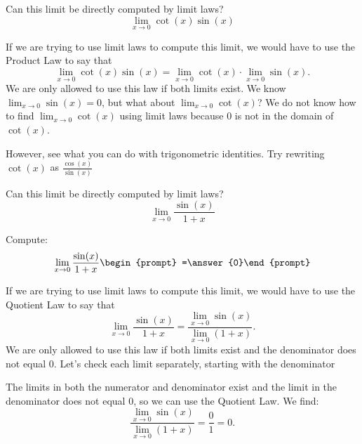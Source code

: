 \documentclass{ximera}
\begin{document}
\begin{question}
  Can this limit be directly computed by limit laws?
  \[
  \displaystyle\lim_{x\to 0} \cot(x)\sin(x)
  \]
  \begin{multipleChoice}
  \end{multipleChoice}
  \begin{feedback}
  If we are trying to use limit laws to compute this limit, we would
  have to use the Product Law to say that
  \[
  \displaystyle\lim_{x\to 0} \cot(x)\sin(x) =\lim_{x\to 0} \cot(x) \cdot \lim_{x\to 0}\sin(x).
  \]
  We are only allowed to use this law if both limits exist.  We know
  $\displaystyle\lim_{x\to 0} \sin(x) = 0$, but what about $\displaystyle\lim_{x\to 0}\cot(x)$?  We do
  not know how to find $\lim_{x\to 0}\cot(x)$ using limit laws because $0$
  is not in the domain of $\cot(x)$.
  \end{feedback}
  
  However, see what you can do with trigonometric identities. Try rewriting $\cot(x)$ as $\frac{\cos(x)}{\sin(x)}$
\end{question}


\begin{question}
  Can this limit be directly computed by limit laws?
  \[
  \displaystyle\lim_{x\to 0} \frac{\sin(x)}{1+x}
  \]
  \begin{multipleChoice}
  \end{multipleChoice}
  \begin{question}
    Compute:
    \[
    \displaystyle\lim_{x\to 0} \frac{\sin(x)}{1+x}\begin{prompt} =\answer{0}\end{prompt}
    \]
    \begin{feedback}
      If we are trying to use limit laws to compute this limit, we
      would have to use the Quotient Law to say that
      \[
      \displaystyle\lim_{x\to 0} \frac{\sin(x)}{1+x} = \displaystyle\frac{\lim_{x\to
          0}\sin(x)}{\lim_{x\to 0}(1+x)}.
      \]
      We are only allowed to use this law if both limits exist and the
      denominator does not equal $0$.  Let's check each limit
      separately, starting with the denominator
      
      The limits in both the numerator and denominator exist and the
      limit in the denominator does not equal $0$, so we can use the
      Quotient Law.  We find:
      \[
        \displaystyle \frac{\lim_{x\to 0}\sin(x)}{\lim_{x\to 0}(1+x)}=\frac{0}{1}=0.
        \]
    \end{feedback}
  \end{question}
\end{question}
\end{document}
